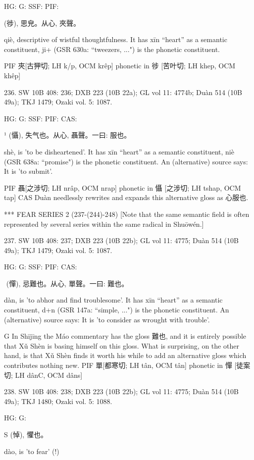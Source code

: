 HG:
G: SSF: PIF:

(徏),
思皃。从心, 夾聲。

qiè,
descriptive of wistful thoughtfulness.
It has xīn ``heart'' as a semantic constituent,
ji+ (GSR 630a: ``tweezers, ...") is the phonetic constituent.

PIF     夾[古狎切; LH k/p, OCM krêp] phonetic in 徏 [苦叶切; LH khep, OCM khêp]

236. SW 10B 408: 236; DXB 223 (10B 22a); GL vol 11: 4774b; Duàn 514 (10B 49a); TKJ 1479; Ozaki vol. 5: 1087.


HG:
G: SSF: PIF: CAS:

¹ (懾), 失气也。从心,
聶聲。一曰: 服也。


shè,
is 'to be disheartened'.
It has xīn ``heart'' as a semantic constituent,
niè (GSR 638a: ``promise") is the phonetic constituent. An (alternative) source says:
It is 'to submit'.

PIF     聶[之涉切; LH nrâp, OCM nrap] phonetic in 懾 [之涉切; LH tshap, OCM tap]
CAS   Duàn needlessly rewrites and expands this alternative gloss as 心服也.



***
FEAR SERIES 2 (237-(244)-248)
[Note that the same semantic field is often represented by several series within the same radical in
Shuōwén.]


237. SW 10B 408: 237; DXB 223 (10B 22b); GL vol 11: 4775; Duàn 514 (10B 49a); TKJ 1479; Ozaki vol. 5: 1087.


HG:
G: SSF: PIF: CAS:

 (憚), 忌難也。从心,
單聲。一曰: 難也。


dàn,
is 'to abhor and find troublesome'.
It has xīn ``heart'' as a semantic constituent,
d+n (GSR 147a: ``simple, ...") is the phonetic constituent. An (alternative) source says:
It is 'to consider as wrought with trouble'.

G  In Shījīng the Máo commentary has the gloss 難也, and it is entirely possible that Xǔ Shèn is basing himself on this gloss. What is surprising, on the other hand, is that Xǔ Shèn finds it worth his while to add an alternative gloss which contributes nothing new.
PIF    單[都寒切; LH tân, OCM tân] phonetic in 憚 [徒案切; LH dânC, OCM dâns]

238. SW 10B 408: 238; DXB 223 (10B 22b); GL vol 11: 4775; Duàn 514 (10B 49a); TKJ 1480; Ozaki vol. 5: 1088.


HG:
G:

S (悼),
懼也。


dào,
is 'to fear' (!)

